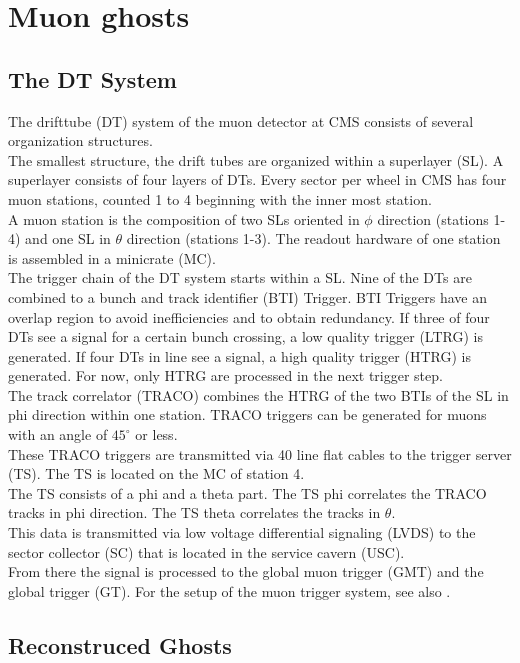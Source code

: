 \section{Muon ghosts}
\subsection{The DT System}
\label{DTSystem}
The drifttube (DT) system of the muon detector at CMS consists of several organization structures.\\
The smallest structure, the drift tubes are organized within a superlayer (SL). A superlayer consists of four layers of DTs. Every sector per wheel in CMS has four muon stations, counted 1 to 4 beginning with the inner most station.\\
A muon station is the composition of two SLs oriented in $\phi$ direction (stations 1-4) and one SL in $\theta$ direction (stations 1-3). The readout hardware of one station is assembled in a minicrate (MC).\\
The trigger chain of the DT system starts within a SL. Nine of the DTs are combined to a bunch and track identifier (BTI) Trigger. BTI Triggers have an overlap region to avoid inefficiencies and to obtain redundancy. If three of four DTs see a signal for a certain bunch crossing, a low quality trigger (LTRG) is generated. If four DTs in line see a signal, a high quality trigger (HTRG) is generated. For now, only HTRG are processed in the next trigger step.\\
The track correlator (TRACO) combines the HTRG of the two BTIs of the SL in phi direction within one station. TRACO triggers can be generated for muons with an angle of $45^{\circ}$ \cite{bunchedBeamTest} or less.\\
These TRACO triggers are transmitted via 40 line flat cables to the trigger server (TS). The TS is located on the MC of station 4.\\
The TS consists of a phi and a theta part. The TS phi correlates the TRACO tracks in phi direction. The TS theta correlates the tracks in $\theta$.\\
This data is transmitted via low voltage differential signaling (LVDS) to the sector collector (SC) that is located in the service cavern (USC).\\
From there the signal is processed to the global muon trigger (GMT) and the global trigger (GT).
For the setup of the muon trigger system, see also \cite{cmsMuonProject}.
\subsection{Reconstruced Ghosts}
